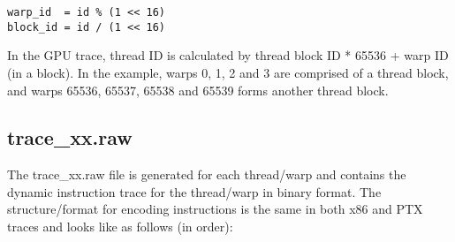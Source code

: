 \begin{Verbatim}
warp_id  = id % (1 << 16)
block_id = id / (1 << 16)
\end{Verbatim}

\ignore
		{
		In the GPU trace, thread ID is calculated by thread block ID * 65536 + warp ID (in a block). 
		In the example, warps 0, 1, 2 and 3 are comprised of a thread block, and warps 65536, 65537, 65538
		and 65539 forms another thread block.
		}

\subsection{trace\_xx.raw}

The trace\_xx.raw file is generated for each thread/warp and contains the
dynamic instruction trace for the thread/warp in binary
format. The structure/format for encoding instructions is the same in
both x86 and PTX traces and looks like as follows (in order):



